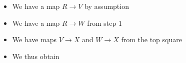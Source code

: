 \begin{itemize}
  \begin{itemize}
  \tightlist
  \item
    We have a map \(R\to V\) by assumption
  \item
    We have a map \(R\to W\) from step 1
  \item
    We have maps \(V\to X\) and \(W\to X\) from the top square
  \item
    We thus obtain

    \begin{center}
    \end{center}
  \end{itemize}
\end{itemize}





